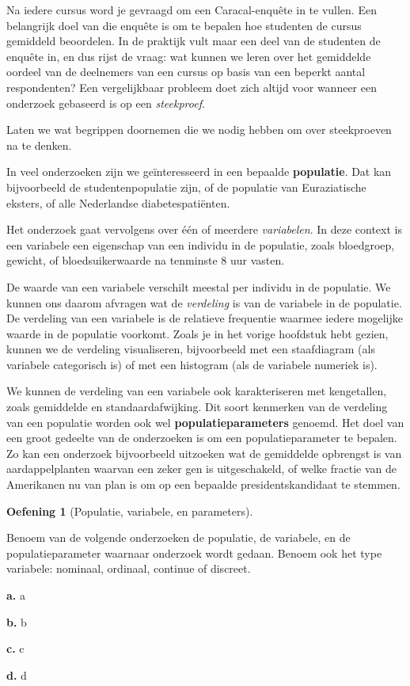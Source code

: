 \documentclass[
  a4paper,
]{scrbook}
\theoremstyle{definition}
\newtheorem{exercise}{Oefening}[chapter]
\theoremstyle{definition}
\theoremstyle{remark}
\begin{document}
Na iedere cursus word je gevraagd om een Caracal-enquête in te vullen.
Een belangrijk doel van die enquête is om te bepalen hoe studenten de
cursus gemiddeld beoordelen. In de praktijk vult maar een deel van de
studenten de enquête in, en dus rijst de vraag: wat kunnen we leren over
het gemiddelde oordeel van de deelnemers van een cursus op basis van een
beperkt aantal respondenten? Een vergelijkbaar probleem doet zich altijd
voor wanneer een onderzoek gebaseerd is op een \emph{steekproef}.

Laten we wat begrippen doornemen die we nodig hebben om over
steekproeven na te denken.

In veel onderzoeken zijn we geïnteresseerd in een bepaalde
\textbf{populatie}. Dat kan bijvoorbeeld de studentenpopulatie zijn, of
de populatie van Euraziatische eksters, of alle Nederlandse
diabetespatiënten.

Het onderzoek gaat vervolgens over één of meerdere \emph{variabelen}. In
deze context is een variabele een eigenschap van een individu in de
populatie, zoals bloedgroep, gewicht, of bloedsuikerwaarde na tenminste
8 uur vasten.

De waarde van een variabele verschilt meestal per individu in de
populatie. We kunnen ons daarom afvragen wat de \emph{verdeling} is van
de variabele in de populatie. De verdeling van een variabele is de
relatieve frequentie waarmee iedere mogelijke waarde in de populatie
voorkomt. Zoals je in het vorige hoofdstuk hebt gezien, kunnen we de
verdeling visualiseren, bijvoorbeeld met een staafdiagram (als variabele
categorisch is) of met een histogram (als de variabele numeriek is).

We kunnen de verdeling van een variabele ook karakteriseren met
kengetallen, zoals gemiddelde en standaardafwijking. Dit soort kenmerken
van de verdeling van een populatie worden ook wel
\textbf{populatieparameters} genoemd. Het doel van een groot gedeelte
van de onderzoeken is om een populatieparameter te bepalen. Zo kan een
onderzoek bijvoorbeeld uitzoeken wat de gemiddelde opbrengst is van
aardappelplanten waarvan een zeker gen is uitgeschakeld, of welke
fractie van de Amerikanen nu van plan is om op een bepaalde
presidentskandidaat te stemmen.

\begin{exercise}[Populatie, variabele, en
parameters]\protect\hypertarget{exr-pop-var-par}{}\label{exr-pop-var-par}

Benoem van de volgende onderzoeken de populatie, de variabele, en de
populatieparameter waarnaar onderzoek wordt gedaan. Benoem ook het type
variabele: nominaal, ordinaal, continue of discreet.

\textbf{a.} a

\textbf{b.} b

\textbf{c.} c

\textbf{d.} d

\end{exercise}
\end{document}
